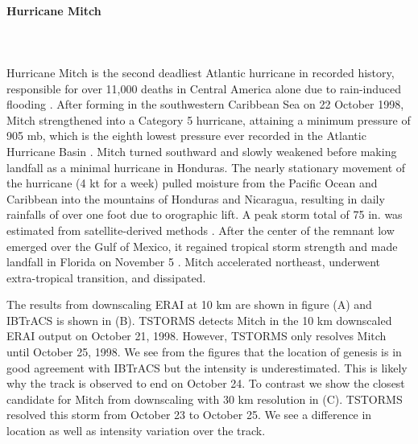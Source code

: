 \documentclass[phd,tocprelim]{cornell}
\newcommand{\myparagraph}[1]{\paragraph{#1}\mbox{}\\\mbox{}\\}
\begin{document}
\myparagraph{Hurricane Mitch}
Hurricane Mitch is the second deadliest Atlantic hurricane in 
recorded history, responsible for over 11,000 deaths in Central 
America alone due to rain-induced flooding \cite{hellin}.  After 
forming in the southwestern Caribbean Sea on 22 October 1998, 
Mitch strengthened into a Category 5 hurricane, attaining a 
minimum pressure of 905 mb, which is the eighth lowest pressure 
ever recorded in the Atlantic Hurricane Basin \cite{pasch}.  Mitch 
turned southward and slowly weakened before making landfall as a 
minimal hurricane in Honduras.  The nearly stationary movement of 
the hurricane (4 kt for a week) pulled moisture from the Pacific 
Ocean and Caribbean into the mountains of Honduras and Nicaragua, 
resulting in daily rainfalls of over one foot due to orographic 
lift.  A peak storm total of 75 in. was estimated from satellite-derived 
methods \cite{hellin}.  After the center of the remnant low emerged 
over the Gulf of Mexico, it regained tropical storm strength and 
made landfall in Florida on November 5 \cite{pasch}.  Mitch accelerated 
northeast, underwent extra-tropical transition, and dissipated.
\par
The results from downscaling ERAI at 10 km are shown in figure 
 (A) and IBTrACS is shown in  
(B). TSTORMS detects Mitch in the 10 km downscaled ERAI output on 
October 21, 1998. However, TSTORMS only resolves Mitch until October 
25, 1998. We see from the figures that the location of genesis is in 
good agreement with IBTrACS but the intensity is underestimated. This 
is likely why the track is observed to end on October 24. To contrast 
we show the closest candidate for Mitch from downscaling with 30 km 
resolution in  (C). TSTORMS resolved this 
storm from October 23 to October 25. We see a difference in location 
as well as intensity variation over the track.  
\end{document}
